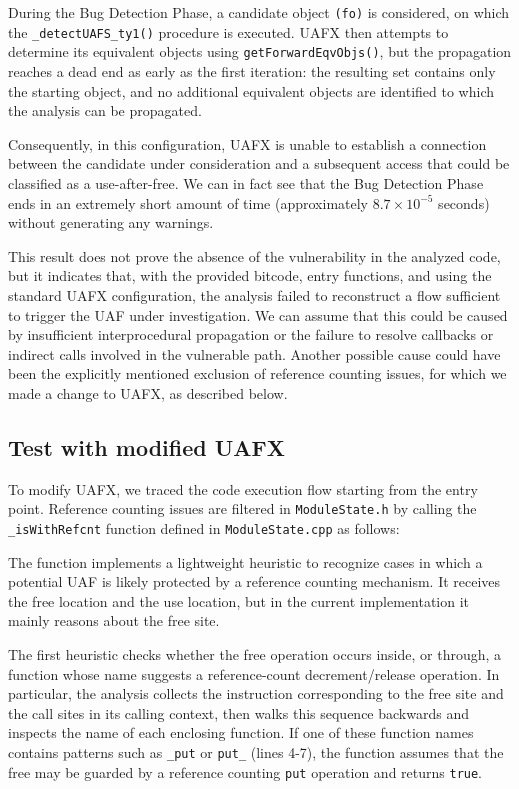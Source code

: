 During the Bug Detection Phase, a candidate object \texttt{(fo)} is considered, on which the \texttt{\_detectUAFS\_ty1()} procedure is executed. UAFX then attempts to determine its equivalent objects using \texttt{getForwardEqvObjs()}, but the propagation reaches a dead end as early as the first iteration: the resulting set contains only the starting object, and no additional equivalent objects are identified to which the analysis can be propagated.

Consequently, in this configuration, UAFX is unable to establish a connection between the candidate under consideration and a subsequent access that could be classified as a use-after-free. We can in fact see that the Bug Detection Phase ends in an extremely short amount of time (approximately $8.7 \times 10^{-5}$ seconds) without generating any warnings.

This result does not prove the absence of the vulnerability in the analyzed code, but it indicates that, with the provided bitcode, entry functions, and using the standard UAFX configuration, the analysis failed to reconstruct a flow sufficient to trigger the UAF under investigation. We can assume that this could be caused by insufficient interprocedural propagation or the failure to resolve callbacks or indirect calls involved in the vulnerable path. Another possible cause could have been the explicitly mentioned exclusion of reference counting issues, for which we made a change to UAFX, as described below.

\subsection{Test with modified UAFX}

To modify UAFX, we traced the code execution flow starting from the entry point. Reference counting issues are filtered in \texttt{ModuleState.h} by calling the \texttt{\_isWithRefcnt} function defined in \texttt{ModuleState.cpp} as follows: 

\begin{listing}[H]
\end{listing}

\noindent The function implements a lightweight heuristic to recognize cases in which a potential UAF is likely protected by a reference counting mechanism. It receives the free location and the use location, but in the current implementation it mainly reasons about the free site.

The first heuristic checks whether the free operation occurs inside, or through, a function whose name suggests a reference-count decrement/release operation. In particular, the analysis collects the instruction corresponding to the free site and the call sites in its calling context, then walks this sequence backwards and inspects the name of each enclosing function. If one of these function names contains patterns such as \texttt{\_put} or \texttt{put\_} (lines 4-7), the function assumes that the free may be guarded by a reference counting \texttt{put} operation and returns \texttt{true}.

